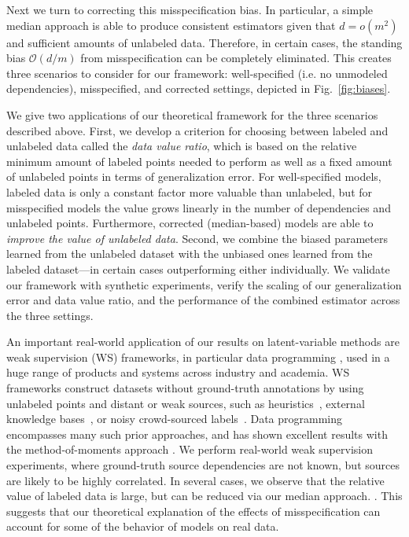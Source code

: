 Next we turn to correcting this misspecification bias. In particular, a simple median approach is able to produce consistent estimators given that $d = o(m^2)$ and sufficient amounts of unlabeled data. Therefore, in certain cases, the standing bias $\mathcal{O}(d/m)$ from misspecification can be completely eliminated. This creates three scenarios to consider for our framework: well-specified (i.e. no unmodeled dependencies), misspecified, and corrected settings, depicted in Fig.~\ref{fig:biases}.

We give two applications of our theoretical framework for the three scenarios described above. First, we develop a criterion for choosing between labeled and unlabeled data called the \textit{data value ratio}, which is based on the relative minimum amount of labeled points needed to perform as well as a fixed amount of unlabeled points in terms of generalization error. For well-specified models, labeled data is only a constant factor more valuable than unlabeled, but for misspecified models the value grows linearly in the number of dependencies and unlabeled points. Furthermore, corrected (median-based) models are able to \emph{improve the value of unlabeled data}. Second, we combine the biased parameters learned from the unlabeled dataset with the unbiased ones learned from the labeled dataset---in certain cases outperforming either individually. We validate our  framework with synthetic experiments, verify the scaling of our generalization error and data value ratio, and the performance of the combined estimator across the three settings. 

An important real-world application of our results on latent-variable methods are weak supervision (WS) frameworks, in particular data programming \citep{Ratner16}, used in a huge range of products and systems across industry and academia. WS frameworks construct datasets without ground-truth annotations by using unlabeled points and distant or weak sources, such as heuristics~\citep{gupta2014improved}, external knowledge bases~\citep{mintz2009distant,craven:ismb99,takamatsu:acl12}, or noisy crowd-sourced labels~\citep{karger2011iterative,dawid1979maximum}. Data programming encompasses many such prior approaches, and has shown excellent results with the method-of-moments approach \citep{fu2020fast}. We perform real-world weak supervision experiments, where ground-truth source dependencies are not known, but sources are likely to be highly correlated. In several cases, we observe that the relative value of labeled data is large, but can be reduced via our median approach. . This suggests that our theoretical explanation of the effects of misspecification can account for some of the behavior of models on real data.

